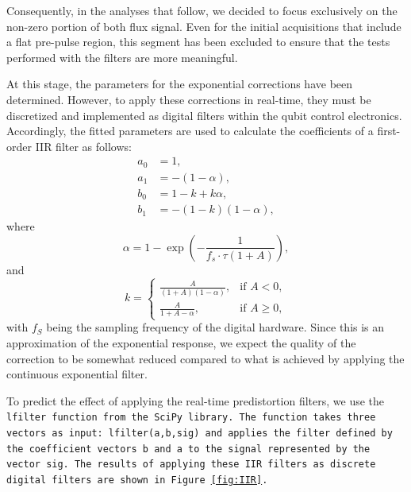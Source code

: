 Consequently, in the analyses that follow, we decided to focus exclusively on the non-zero portion of both flux signal. 
Even for the initial acquisitions that include a flat pre-pulse region, this segment has been excluded to ensure that the tests performed with the filters are more meaningful.

At this stage, the parameters for the exponential corrections have been determined. However, to apply these corrections in real-time, they must be discretized and implemented as digital filters within the qubit control electronics. 
Accordingly, the fitted parameters are used to calculate the coefficients of a first-order IIR filter as follows:
\begin{align}
    a_0 &= 1, \\
    a_1 &= -(1 - \alpha), \\
    b_0 &= 1 - k + k \alpha, \\
    b_1 &= -(1 - k)(1 - \alpha),
\end{align}
where 
\begin{equation}
\alpha = 1 - \exp\left(-\frac{1}{f_s \cdot \tau (1 + A)}\right),
\end{equation}
and
\begin{equation}
    k =
    \begin{cases}
    \frac{A}{(1 + A)(1 - \alpha)}, & \text{if } A < 0, \\
    \frac{A}{1 + A - \alpha}, & \text{if } A \geq 0,
    \end{cases}
\end{equation}
with $f_S$ being the sampling frequency of the digital hardware.
Since this is an approximation of the exponential response, we expect the quality of the correction to be somewhat reduced compared to what is achieved by applying the continuous exponential filter.

To predict the effect of applying the real-time predistortion filters, we use the \tt{lfilter} function from the \tt{SciPy} library. 
The function takes three vectors as input: \tt{lfilter(a,b,sig)} and applies the filter defined by the coefficient vectors \tt{b} and \tt{a} to the signal represented by the vector \tt{sig}. 
The results of applying these IIR filters as discrete digital filters are shown in Figure \ref{fig:IIR}.


